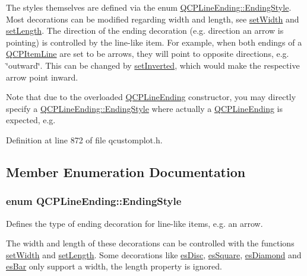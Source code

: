 The styles themselves are defined via the enum \hyperlink{class_q_c_p_line_ending_a5ef16e6876b4b74959c7261d8d4c2cd5}{Q\+C\+P\+Line\+Ending\+::\+Ending\+Style}. Most decorations can be modified regarding width and length, see \hyperlink{class_q_c_p_line_ending_a26dc020ea985a72cc25881ce2115e34e}{set\+Width} and \hyperlink{class_q_c_p_line_ending_ae36fa01763751cd64b7f56c3507e935a}{set\+Length}. The direction of the ending decoration (e.\+g. direction an arrow is pointing) is controlled by the line-\/like item. For example, when both endings of a \hyperlink{class_q_c_p_item_line}{Q\+C\+P\+Item\+Line} are set to be arrows, they will point to opposite directions, e.\+g. \char`\"{}outward\char`\"{}. This can be changed by \hyperlink{class_q_c_p_line_ending_a580e4e2360b35ebb8d68f3494aa2335d}{set\+Inverted}, which would make the respective arrow point inward.

Note that due to the overloaded \hyperlink{class_q_c_p_line_ending}{Q\+C\+P\+Line\+Ending} constructor, you may directly specify a \hyperlink{class_q_c_p_line_ending_a5ef16e6876b4b74959c7261d8d4c2cd5}{Q\+C\+P\+Line\+Ending\+::\+Ending\+Style} where actually a \hyperlink{class_q_c_p_line_ending}{Q\+C\+P\+Line\+Ending} is expected, e.\+g. 
\begin{DoxyCodeInclude}
\end{DoxyCodeInclude}


Definition at line 872 of file qcustomplot.\+h.



\subsection{Member Enumeration Documentation}
\hypertarget{class_q_c_p_line_ending_a5ef16e6876b4b74959c7261d8d4c2cd5}{}
\subsubsection[{Ending\+Style}]{\setlength{\rightskip}{0pt plus 5cm}enum {\bf Q\+C\+P\+Line\+Ending\+::\+Ending\+Style}}\label{class_q_c_p_line_ending_a5ef16e6876b4b74959c7261d8d4c2cd5}
Defines the type of ending decoration for line-\/like items, e.\+g. an arrow.



The width and length of these decorations can be controlled with the functions \hyperlink{class_q_c_p_line_ending_a26dc020ea985a72cc25881ce2115e34e}{set\+Width} and \hyperlink{class_q_c_p_line_ending_ae36fa01763751cd64b7f56c3507e935a}{set\+Length}. Some decorations like \hyperlink{class_q_c_p_line_ending_a5ef16e6876b4b74959c7261d8d4c2cd5ae5a3414916817258bcc6dddd605e8f5c}{es\+Disc}, \hyperlink{class_q_c_p_line_ending_a5ef16e6876b4b74959c7261d8d4c2cd5ae1836502fa43d8990bb62b2d493a140a}{es\+Square}, \hyperlink{class_q_c_p_line_ending_a5ef16e6876b4b74959c7261d8d4c2cd5a378fe5a8b768411b0bc1765210fe7200}{es\+Diamond} and \hyperlink{class_q_c_p_line_ending_a5ef16e6876b4b74959c7261d8d4c2cd5a2cf543bbca332df26d89bf779f50469f}{es\+Bar} only support a width, the length property is ignored.

